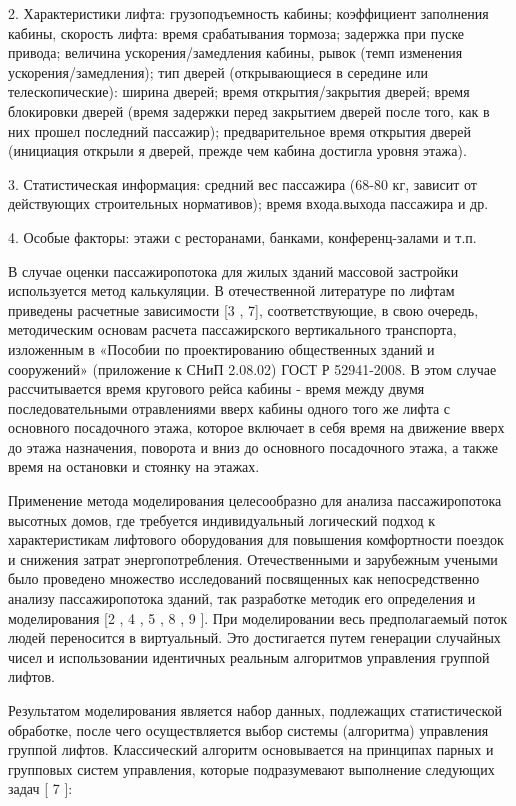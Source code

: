 	2. Характеристики лифта: грузоподъемность кабины; коэффициент заполнения кабины, скорость лифта: время срабатывания тормоза;
		задержка при пуске привода; величина ускорения/замедления кабины, рывок (темп изменения ускорения/замедления);
		тип дверей (открывающиеся в середине или телескопические): ширина дверей; время открытия/закрытия дверей;
		время блокировки дверей (время задержки перед закрытием дверей после того, как в них прошел последний пассажир);
		предварительное время открытия дверей (инициация открыли я дверей, прежде чем кабина достигла уровня этажа).

	3. Статистическая информация: средний вес пассажира (68-80 кг, зависит от действующих строительных нормативов);
		время входа.выхода пассажира и др.

	4. Особые факторы: этажи с ресторанами, банками, конференц-залами и т.п.
	 
	В случае оценки пассажиропотока для жилых зданий массовой застройки используется метод калькуляции.
		В отечественной литературе по лифтам приведены расчетные зависимости [3 , 7], соответствующие, в свою очередь, методическим
		основам расчета пассажирского вертикального транспорта, изложенным в «Пособии по проектированию общественных зданий и сооружений»
		(приложение к СНиП 2.08.02) ГОСТ Р 52941-2008. В этом случае рассчитывается время кругового рейса кабины -
		время между двумя последовательными отравлениями вверх кабины одного того же лифта с основного посадочного этажа,
		которое включает в себя время на движение вверх до этажа назначения, поворота и вниз до основного посадочного этажа,
		а также время на остановки и стоянку на этажах.

	Применение метода моделирования целесообразно для анализа пассажиропотока высотных домов, где требуется индивидуальный
		логический подход к характеристикам лифтового оборудования для повышения комфортности поездок и снижения затрат энергопотребления.
		Отечественными и зарубежным учеными было проведено множество исследований посвященных как непосредственно анализу пассажиропотока зданий,
		так разработке методик его определения и моделирования [2 , 4 , 5 , 8 , 9 ]. При моделировании весь предполагаемый поток людей
		переносится в виртуальный. Это достигается путем генерации случайных чисел и использовании идентичных реальным алгоритмов
		управления группой лифтов.
		
	Результатом моделирования является набор данных, подлежащих статистической обработке, после чего осуществляется выбор системы (алгоритма)
		управления группой лифтов. Классический алгоритм основывается на принципах парных и групповых систем управления,
		которые подразумевают выполнение следующих задач [ 7 ]:

